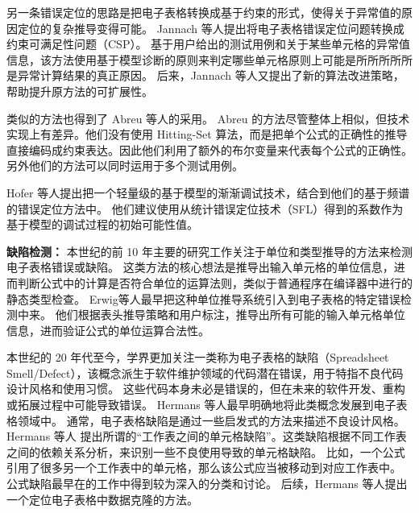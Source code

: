 另一条错误定位的思路是把电子表格转换成基于约束的形式，使得关于异常值的原因定位的复杂推导变得可能。
Jannach 等人\cite{jannach2010toward}提出将电子表格错误定位问题转换成约束可满足性问题（CSP）\cite{tsang2014foundations}。
基于用户给出的测试用例和关于某些单元格的异常值信息，该方法使用基于模型诊断的原则来判定哪些单元格原则上可能是所所所所所是异常计算结果的真正原因。
后来，Jannach 等人\cite{jannach2016model}又提出了新的算法改进策略，帮助提升原方法的可扩展性。

类似的方法也得到了 Abreu 等人\cite{abreu2012constraint,abreu2012debugging}的采用。
Abreu 的方法尽管整体上相似，但技术实现上有差异。他们没有使用 Hitting-Set 算法\cite{reiter1987theory}，而是把单个公式的正确性的推导直接编码成约束表达。因此他们利用了额外的布尔变量来代表每个公式的正确性。另外他们的方法可以同时运用于多个测试用例。

Hofer 等人\cite{hofer2013empirical}提出把一个轻量级的基于模型的渐渐调试技术，结合到他们的基于频谱的错误定位方法中。
他们建议使用从统计错误定位技术（SFL）得到的系数作为基于模型的调试过程的初始可能性值。

\textbf{缺陷检测：}%
本世纪的前 10 年主要的研究工作关注于单位和类型推导的方法\cite{erwig2002adding,burnett2002testing,ahmad2003type,abraham2004header,abraham2006type,abraham2007ucheck,antoniu2004validating,chambers2009automatic,chambers2010reasoning}来检测电子表格错误或缺陷。
这类方法的核心想法是推导出输入单元格的单位信息，进而判断公式中的计算是否符合单位的运算法则，类似于普通程序在编译器中进行的静态类型检查。
Erwig等人\cite{erwig2002adding,abraham2004header}最早把这种单位推导系统引入到电子表格的特定错误检测中来。
他们根据表头推导策略和用户标注，推导出所有可能的输入单元格单位信息，进而验证公式的单位运算合法性。

本世纪的 20 年代至今，学界更加关注一类称为电子表格的缺陷（Spreadsheet Smell/Defect），该概念派生于软件维护领域的代码潜在错误\cite{fowler1997refactoring}，用于特指不良代码设计风格和使用习惯。
这些代码本身未必是错误的，但在未来的软件开发、重构或拓展过程中可能导致错误。
Hermans 等人\cite{hermans2012detecting,hermans2012detecting2,hermans2013data}最早明确地将此类概念发展到电子表格领域中。
通常，电子表格缺陷是通过一些启发式的方法来描述不良设计风格。
Hermans 等人\cite{hermans2012detecting} 提出所谓的“工作表之间的单元格缺陷”。这类缺陷根据不同工作表之间的依赖关系分析，来识别一些不良使用导致的单元格缺陷。
比如，一个公式引用了很多另一个工作表中的单元格，那么该公式应当被移动到对应工作表中。
公式缺陷最早在\cite{hermans2012detecting2}的工作中得到较为深入的分类和讨论。
后续，Hermans 等人\cite{hermans2013data}提出一个定位电子表格中数据克隆的方法。

